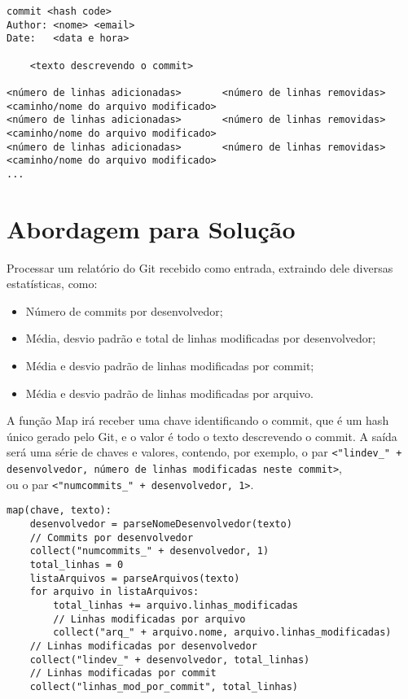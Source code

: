 \begin{tiny}
\begin{verbatim}
commit <hash code>
Author: <nome> <email>
Date:   <data e hora>

    <texto descrevendo o commit>

<número de linhas adicionadas>       <número de linhas removidas>       <caminho/nome do arquivo modificado>
<número de linhas adicionadas>       <número de linhas removidas>       <caminho/nome do arquivo modificado>
<número de linhas adicionadas>       <número de linhas removidas>       <caminho/nome do arquivo modificado>
...
\end{verbatim}
\end{tiny}

\section{Abordagem para Solução}

Processar um relatório do Git recebido como entrada, extraindo dele diversas estatísticas, como:
\begin{itemize}
\item Número de commits por desenvolvedor;
\item Média, desvio padrão e total de linhas modificadas por desenvolvedor;
\item Média e desvio padrão de linhas modificadas por commit;
\item Média e desvio padrão de linhas modificadas por arquivo.
\end{itemize}

A função Map irá receber uma chave identificando o commit, que é um hash único gerado pelo Git,
e o valor é todo o texto descrevendo o commit. A saída será uma série de chaves e valores,
contendo, por exemplo, o par \texttt{<"lindev\_" + desenvolvedor, número de linhas
modificadas neste commit>}, \\
ou o par \texttt{<"numcommits\_" + desenvolvedor, 1>}.

\begin{verbatim}
map(chave, texto):
    desenvolvedor = parseNomeDesenvolvedor(texto)
    // Commits por desenvolvedor
    collect("numcommits_" + desenvolvedor, 1)
    total_linhas = 0
    listaArquivos = parseArquivos(texto)
    for arquivo in listaArquivos:
        total_linhas += arquivo.linhas_modificadas
        // Linhas modificadas por arquivo
        collect("arq_" + arquivo.nome, arquivo.linhas_modificadas)
    // Linhas modificadas por desenvolvedor
    collect("lindev_" + desenvolvedor, total_linhas)
    // Linhas modificadas por commit
    collect("linhas_mod_por_commit", total_linhas)
\end{verbatim}

